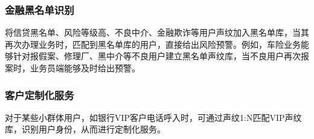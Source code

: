 \subsubsection{金融黑名单识别}
将信贷黑名单、风险等级高、不良中介、金融欺诈等用户声纹加入黑名单库，当其再次办理业务时，匹配到黑名单库的用户，直接给出风险预警。例如，车险业务能够针对报假案、修理厂、黑中介等不良用户建立黑名单声纹库，当不良用户再次报案时，业务员端能够及时给出预警。

\subsubsection{客户定制化服务}
对于某些小群体用户，如银行VIP客户电话呼入时，可通过声纹1:N匹配VIP声纹库，识别用户身份，从而进行定制化服务。





